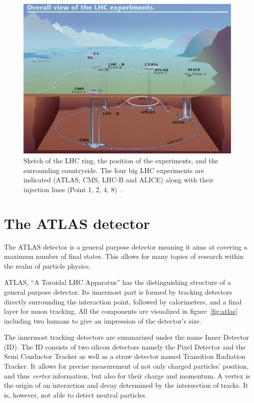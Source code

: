 \begin{figure}[htbp]
  \centering
  \includegraphics[scale=0.4]{figures_LHC/CERN-all-experiments.jpg}
  \caption[Sketch of the LHC ring.]{Sketch of the LHC ring, the position
    of the experiments, and the surrounding countryside. The four big
    LHC experiments are indicated (ATLAS, CMS, LHC-B and ALICE) along with their injection lines (Point 1, 2, 4, 8)~\cite{Jean-Luc:841555}.}
  \label{fig:LHC}
\end{figure}


\section{The ATLAS detector}

The ATLAS detector is a general purpose detector meaning it aims at covering a maximum number of final states. This allows for many topics of research within the realm of particle physics.

ATLAS, \enquote{A Toroidal LHC Apparatus} has the distinguishing structure of a general purpose detector. Its innermost part is formed by tracking detectors directly surrounding the interaction point, followed by calorimeters, and a final layer for muon tracking. All the components are visualized in figure~\ref{fig:atlas} including two humans to give an impression of the detector's size.

The innermost tracking detectors are summarized under the name Inner Detector (ID). The ID consists of two silicon detectors namely the Pixel Detector and the Semi Conductor Tracker as well as a straw detector named Transition Radiation Tracker. It allows for precise measurement of not only charged particles' position, and thus \emph{vertex} information, but also for their charge and momentum. A vertex is the origin of an interaction and decay determined by the intersection of tracks.  It is, however, not able to detect neutral particles.

